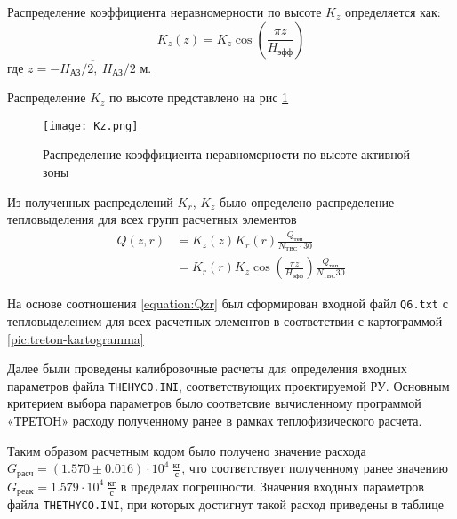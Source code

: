 \noindent Распределение коэффициента неравномерности по высоте $K_z$ определяется как:
\begin{equation}
    K_z(z) = K_z \cos \left( \frac {\pi z} {H_{\text{эфф}}} \right)
\end{equation}
где $z = \overline{-H_{\text{АЗ}} / 2,\  H_{\text{АЗ}} / 2}$ м.


\noindent Распределение $K_z$ по высоте представлено на рис \ref{pic:Kz}


\begin{figure}[H]
	\begin{center}
		\texttt{[image: Kz.png]}
		\caption{Распределение коэффициента неравномерности по высоте активной зоны}
		\label{pic:Kz}
	\end{center}
\end{figure}


Из полученных распределений $K_r$, $K_z$ было определено распределение тепловыделения для всех групп расчетных элементов
\begin{align}
    \label{equation:Qzr}
    Q(z, r) &= K_z(z)K_r(r)\frac{Q_{\text{теп}}}{N_{\text{ТВС}} \cdot 30} \\
            &= K_r(r) K_z \cos \left( \frac{\pi z}{H_{\text{эфф}}} \right) \frac{Q_{\text{теп}}}{N_{\text{ТВС}} 30}
\end{align}

На основе соотношения \ref{equation:Qzr} был сформирован входной файл \texttt{Q6.txt} с тепловыделением для всех расчетных элементов в соответствии с картограммой \ref{pic:treton-kartogramma}

Далее были проведены калибровочные расчеты для определения входных параметров файла \texttt{THEHYCO.INI}, соответствующих проектируемой РУ. Основным критерием выбора параметров было соответсвие вычисленному программой «ТРЕТОН» расходу полученному ранее в рамках теплофизического расчета.

Таким образом расчетным кодом было получено значение расхода $G_{\text{расч}} = (1.570 \pm 0.016) \cdot 10^4\  \frac{\text{кг}}{\text{с}}$, что соответствует полученному ранее значению $G_{\text{реак}} = 1.579 \cdot 10^4\ \frac{\text{кг}}{\text{с}}$ в пределах погрешности. 
Значения входных параметров файла \texttt{THETHYCO.INI}, при которых достигнут такой расход приведены в таблице %



